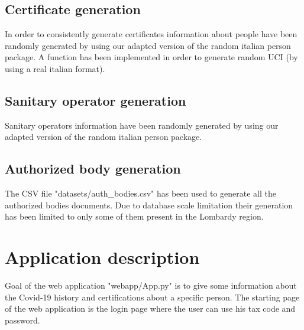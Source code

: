 \documentclass{article}
\begin{document}
\subsection{Certificate generation}
In order to consistently generate certificates information about people have been randomly generated by using our adapted version of the random italian person package. A function has been implemented in order to generate random UCI (by using a real italian format).

\subsection{Sanitary operator generation}
Sanitary operators information have been randomly generated by using our adapted version of the random italian person package.

\subsection{Authorized body generation}
The CSV file {\selectfont"datasets/auth\_bodies.csv"} has been used to generate all the authorized bodies documents. Due to database scale limitation their generation has been limited to only some of them present in the Lombardy region.


\newpage
\section{Application description}
Goal of the web application {\selectfont"webapp/App.py"} is to give some information about the Covid-19 history and certifications about a specific person.
The starting page of the web application is the login page where the user can use his tax code
and password.
\end{document}
